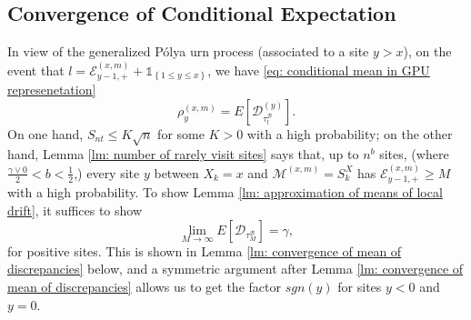 \documentclass[twoside,12pt, a4paper]{article}
\numberwithin{equation}{section}
\theoremstyle{remark}
\newcommand{\comment}[1]{\textcolor{blue}{(Comment: #1)}}
\begin{document}
	\subsection{Convergence of Conditional Expectation}
	\label{sec:RhoGamma}
	In view of the generalized P\'{o}lya urn process (associated to a site $y> x$), 
	on the event that $l = \mathcal{E}^{(x,m)}_{y-1,+} +\mathbb{1}_{\left\{1\leq y\leq x\right\}}$, we have \eqref{eq: conditional mean in GPU represenetation} 
	$$\rho^{(x,m)}_y = E\left[\mathcal{D}_{\tau_l^{\mathcal{B}}}^{(y)}\right].$$ 
	On one hand, $S_{nt} \leq K\sqrt{n} $ for some $K>0$ with a high probability; on the other hand, Lemma \ref{lm: number of rarely visit sites} says that, up to $n^b$ sites, (where $\frac{\gamma \vee 0}{2}<b<\frac{1}{2}$,) every site $y$ between $X_k=x$ and $\mathcal{M}^{(x,m)} =S_{k}^X$ has $ \mathcal{E}^{(x,m)}_{y-1,+} \geq M $ with a high probability. To show Lemma \ref{lm: approximation of means of local drift}, it suffices to show 
	\begin{equation}\label{eq: convergence of conditional expectation}
		\lim_{M\to\infty} E[\mathcal{D}_{\tau_M^{\mathcal{B}}}] = \gamma , 
	\end{equation} for positive sites. This is shown in Lemma \ref{lm: convergence of mean of discrepancies} below, and a symmetric argument after Lemma \ref{lm: convergence of mean of discrepancies} allows us to get the factor $sgn(y)$ for sites $y<0$ and $y=0$.
	
\end{document}
